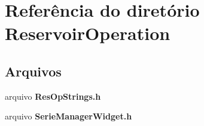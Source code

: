 \section{Referência do diretório Reservoir\+Operation}
\label{dir_7bff9aa4040d1c55402ba2c92bbb7c68}
\subsection*{Arquivos}
\begin{DoxyCompactItemize}
\item 
arquivo {\bf Res\+Op\+Strings.\+h}
\item 
arquivo {\bf Serie\+Manager\+Widget.\+h}
\end{DoxyCompactItemize}
